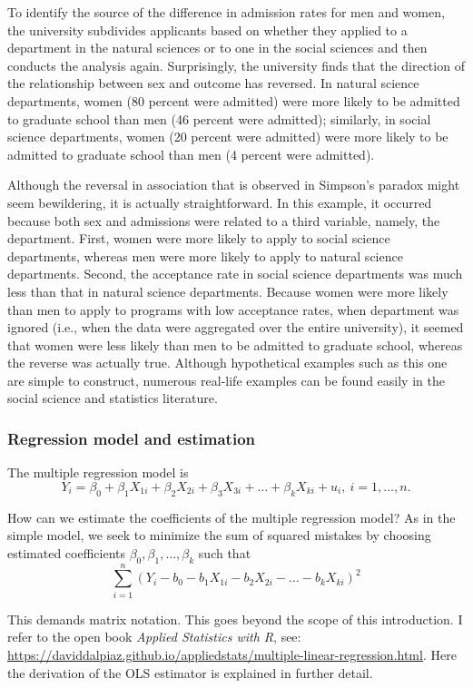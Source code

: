 To identify the source of the difference in admission rates for men and women, the university subdivides applicants based on whether they applied to a department in the natural sciences or to one in the social sciences and then conducts the analysis again. Surprisingly, the university finds that the direction of the relationship between sex and outcome has reversed. In natural science departments, women (80 percent were admitted) were more likely to be admitted to graduate school than men (46 percent were admitted); similarly, in social science departments, women (20 percent were admitted) were more likely to be admitted to graduate school than men (4 percent were admitted).

Although the reversal in association that is observed in Simpson's paradox might seem bewildering, it is actually straightforward. In this example, it occurred because both sex and admissions were related to a third variable, namely, the department. First, women were more likely to apply to social science departments, whereas men were more likely to apply to natural science departments. Second, the acceptance rate in social science departments was much less than that in natural science departments. Because women were more likely than men to apply to programs with low acceptance rates, when department was ignored (i.e., when the data were aggregated over the entire university), it seemed that women were less likely than men to be admitted to graduate school, whereas the reverse was actually true. Although hypothetical examples such as this one are simple to construct, numerous real-life examples can be found easily in the social science and statistics literature.

\subsubsection*{Regression model and estimation}

The multiple regression model is
\[
Y_i = \beta_0 + \beta_1 X_{1i} + \beta_2 X_{2i} + \beta_3 X_{3i} + \dots + \beta_k X_{ki} + u_i, \ i=1,\dots,n.
\]

How can we estimate the coefficients of the multiple regression model? As in the simple model, we seek to minimize the sum of squared mistakes by choosing estimated
coefficients $\beta_0,\beta_1,\dots,\beta_k$ such that
\[\sum_{i=1}^n (Y_i - b_0 - b_1 X_{1i} - b_2 X_{2i} - \dots -  b_k X_{ki})^2 \]

This demands matrix notation. This goes beyond the scope of this introduction. I refer to the open book \textit{Applied Statistics with R}, see: \url{https://daviddalpiaz.github.io/appliedstats/multiple-linear-regression.html}. Here the derivation of the OLS estimator is explained in further detail.


